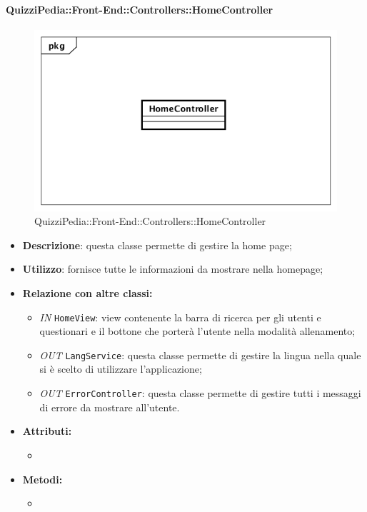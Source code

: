 \paragraph{QuizziPedia::Front-End::Controllers::HomeController}
\begin{figure}
	\centering
	\includegraphics[scale=0.45]{UML/Classi/Front-End/QuizziPedia_Front-end_Controller_HomeController.png}
	\caption{QuizziPedia::Front-End::Controllers::HomeController}
\end{figure}
\begin{itemize}
	\item \textbf{Descrizione}: questa classe permette di gestire la home page;
	\item \textbf{Utilizzo}: fornisce tutte le informazioni da mostrare nella homepage;
	\item \textbf{Relazione con altre classi:}
	\begin{itemize}
		\item \textit{IN} \texttt{HomeView}: view contenente la barra di ricerca per gli utenti e questionari e il bottone che porterà l'utente nella modalità allenamento;
		\item \textit{OUT} \texttt{LangService}: questa classe permette di gestire la lingua nella quale si è scelto di utilizzare l'applicazione;
		\item \textit{OUT} \texttt{ErrorController}: questa classe permette di gestire tutti i messaggi di errore da mostrare all'utente.
	\end{itemize}
	\item \textbf{Attributi:}
	\begin{itemize}
		\item 
	\end{itemize}
	\item \textbf{Metodi:}
	\begin{itemize}
		\item 
	\end{itemize}
\end{itemize}


